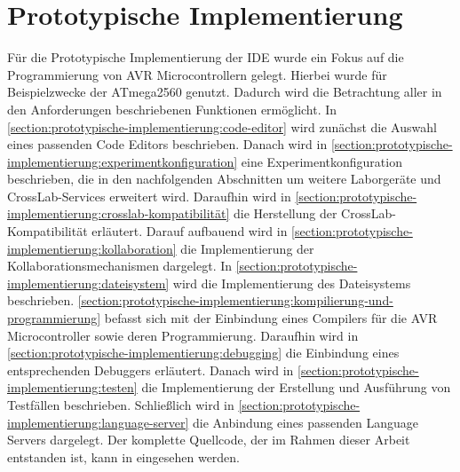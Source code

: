 \chapter{Prototypische Implementierung}\label{section:prototypische-implementierung}

Für die Prototypische Implementierung der IDE wurde ein Fokus auf die Programmierung von AVR Microcontrollern \cite{noauthor_avr_nodate} gelegt. Hierbei wurde für Beispielzwecke der ATmega2560 \cite{noauthor_atmega2560_nodate} genutzt. Dadurch wird die Betrachtung aller in den Anforderungen beschriebenen Funktionen ermöglicht. In \autoref{section:prototypische-implementierung:code-editor} wird zunächst die Auswahl eines passenden Code Editors beschrieben. Danach wird in \autoref{section:prototypische-implementierung:experimentkonfiguration} eine Experimentkonfiguration beschrieben, die in den nachfolgenden Abschnitten um weitere Laborgeräte und CrossLab-Services erweitert wird. Daraufhin wird in \autoref{section:prototypische-implementierung:crosslab-kompatibilität} die Herstellung der CrossLab-Kompatibilität erläutert. Darauf aufbauend wird in \autoref{section:prototypische-implementierung:kollaboration} die Implementierung der Kollaborationsmechanismen dargelegt. In \autoref{section:prototypische-implementierung:dateisystem} wird die Implementierung des Dateisystems beschrieben. \autoref{section:prototypische-implementierung:kompilierung-und-programmierung} befasst sich mit der Einbindung eines Compilers für die AVR Microcontroller sowie deren Programmierung. Daraufhin wird in \autoref{section:prototypische-implementierung:debugging} die Einbindung eines entsprechenden Debuggers erläutert. Danach wird in \autoref{section:prototypische-implementierung:testen} die Implementierung der Erstellung und Ausführung von Testfällen beschrieben. Schließlich wird in \autoref{section:prototypische-implementierung:language-server} die Anbindung eines passenden Language Servers dargelegt. Der komplette Quellcode, der im Rahmen dieser Arbeit entstanden ist, kann in \cite{noauthor_lassertosmasterarbeit_nodate} eingesehen werden.









